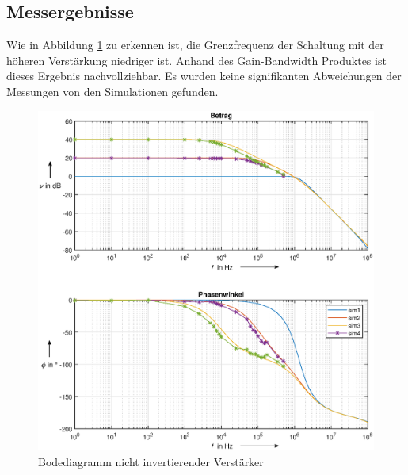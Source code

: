 \subsection{Messergebnisse}
Wie in Abbildung \ref{fig:bode_niinv} zu erkennen ist, die Grenzfrequenz der Schaltung mit der höheren Verstärkung niedriger ist. Anhand des Gain-Bandwidth Produktes ist dieses Ergebnis nachvollziehbar. Es wurden keine signifikanten Abweichungen der Messungen von den Simulationen gefunden. 
\begin{figure}[H]
    \centering
    \includegraphics[width=\costumPlotWidth]{Lab_1/Plots/niinv_verst.eps}
    \caption{Bodediagramm nicht invertierender Verstärker}
    \label{fig:bode_niinv}
\end{figure}

